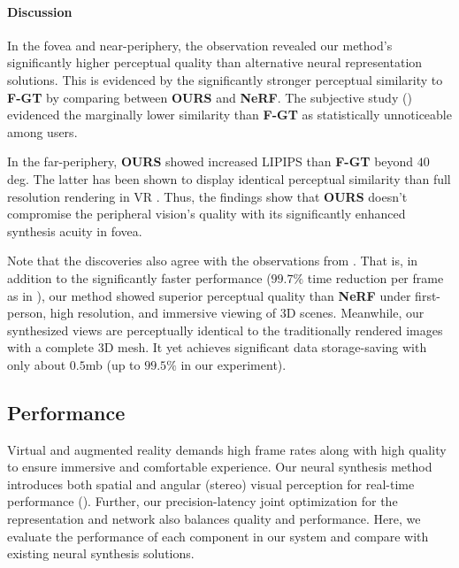 \paragraph{Discussion}
In the fovea and near-periphery, the observation revealed our method's significantly higher perceptual quality than alternative neural representation solutions. This is evidenced by the significantly stronger perceptual similarity to \textbf{F-GT} by comparing between \textbf{OURS} and \textbf{NeRF}. The subjective study () evidenced the marginally lower similarity than \textbf{F-GT} as statistically unnoticeable among users.

In the far-periphery, \textbf{OURS} showed increased LIPIPS than \textbf{F-GT} beyond $40$ deg.
The latter has been shown to display identical perceptual similarity than full resolution rendering in VR \cite{Patney:2016:TFR}.
Thus, the findings show that \textbf{OURS} doesn't compromise the peripheral vision's quality with its significantly enhanced synthesis acuity in fovea. 

Note that the discoveries also agree with the observations from . That is, in addition to the significantly faster performance  ($99.7\%$ time reduction per frame as in ), our method showed superior perceptual quality than \textbf{NeRF} under first-person, high resolution, and immersive viewing of 3D scenes. Meanwhile, our synthesized views are perceptually identical to the traditionally rendered images with a complete 3D mesh. It yet achieves significant data storage-saving with only about $0.5$mb (up to $99.5\%$ in our experiment).

\subsection{Performance}
\label{sec:study:intra}
Virtual and augmented reality demands high frame rates along with high quality to ensure immersive and comfortable experience. Our neural synthesis method introduces both spatial and angular (stereo) visual perception for real-time performance (). 
Further, our precision-latency joint optimization for the representation and network also balances quality and performance.
Here, we evaluate the performance of each component in our system and compare with existing neural synthesis solutions.

